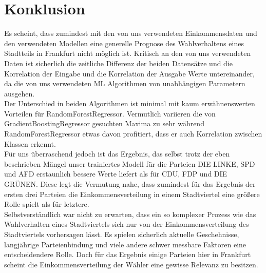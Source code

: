 \documentclass[a4paper,10pt]{scrartcl}
\begin{document}
\section{Konklusion}
Es scheint, dass zumindest mit den von uns verwendeten Einkommensdaten und den verwendeten Modellen eine generelle Prognose des Wahlverhaltens eines Stadtteils in Frankfurt nicht möglich ist. Kritisch an den von uns verwendeten Daten ist sicherlich die zeitliche Differenz der beiden Datensätze und die Korrelation der Eingabe und die Korrelation der Ausgabe Werte untereinander, da die von uns verwendeten ML Algorithmen von unabhängigen Parametern ausgehen.\\
 Der Unterschied in beiden Algorithmen ist minimal mit kaum erwähnenswerten Vorteilen für RandomForestRegressor. Vermutlich variieren die von GradientBoostingRegressor gesuchten Maxima zu sehr während RandomForestRegressor etwas davon profitiert, dass er auch Korrelation zwischen Klassen erkennt.  \\
 Für uns überraschend jedoch ist das Ergebnis, das selbst trotz der eben beschrieben Mängel unser trainiertes Modell für die Parteien DIE LINKE, SPD und AFD erstaunlich bessere Werte liefert als für CDU, FDP und DIE GRÜNEN. Diese legt die Vermutung nahe, dass zumindest für das Ergebnis der ersten drei Parteien die Einkommensverteilung in einem Stadtviertel eine größere Rolle spielt als für letztere.\\
Selbstverständlich war nicht zu erwarten, dass ein so komplexer Prozess wie das Wahlverhalten eines Stadtviertels sich nur von der Einkommensverteilung des Stadtviertels vorhersagen lässt. Es spielen sicherlich aktuelle Geschehnisse, langjährige Parteienbindung und viele andere schwer messbare Faktoren eine entscheidendere Rolle. Doch für das Ergebnis einige Parteien hier in Frankfurt scheint die Einkommensverteilung der Wähler eine gewisse Relevanz zu besitzen. 
\end{document}
